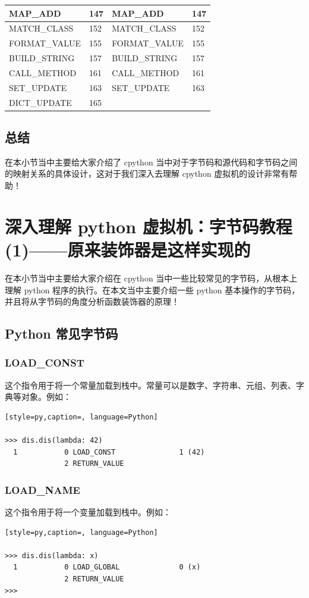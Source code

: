 \begin{table}[H]
\begin{tabular}{|l|l|l|l|}
      MAP\_ADD & 147 &MAP\_ADD & 147 \\ \hline
      MATCH\_CLASS & 152 &MATCH\_CLASS & 152 \\ \hline
      FORMAT\_VALUE & 155 &FORMAT\_VALUE & 155 \\ \hline
      BUILD\_STRING & 157 &BUILD\_STRING & 157 \\ \hline
      CALL\_METHOD & 161 &CALL\_METHOD & 161 \\ \hline
      SET\_UPDATE & 163 &SET\_UPDATE & 163 \\ \hline
      DICT\_UPDATE & 165 & & \\ \hline
        \end{tabular}
\end{table}
\subsection{总结}
在本小节当中主要给大家介绍了 cpython 当中对于字节码和源代码和字节码之间的映射关系的具体设计，这对于我们深入去理解 cpython 虚拟机的设计非常有帮助！

\section{深入理解 python 虚拟机：字节码教程(1)——原来装饰器是这样实现的}
在本小节当中主要给大家介绍在 cpython 当中一些比较常见的字节码，从根本上理解 python 程序的执行。在本文当中主要介绍一些 python 基本操作的字节码，并且将从字节码的角度分析函数装饰器的原理！
\subsection{Python 常见字节码}
\subsubsection{LOAD\_CONST}
这个指令用于将一个常量加载到栈中。常量可以是数字、字符串、元组、列表、字典等对象。例如：
\begin{lstlisting}[style=py,caption=, language=Python]

>>> dis.dis(lambda: 42)
  1           0 LOAD_CONST               1 (42)
              2 RETURN_VALUE
\end{lstlisting}
\subsubsection{LOAD\_NAME}
这个指令用于将一个变量加载到栈中。例如：
\begin{lstlisting}[style=py,caption=, language=Python]

>>> dis.dis(lambda: x)
  1           0 LOAD_GLOBAL              0 (x)
              2 RETURN_VALUE
>>>
\end{lstlisting}
